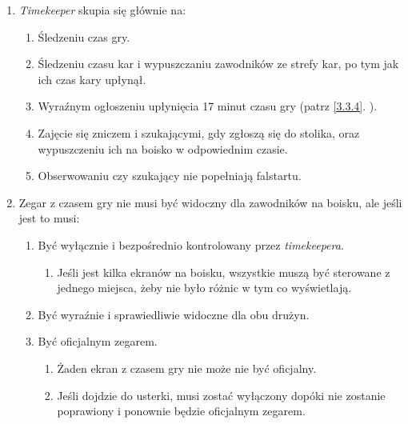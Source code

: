 \documentclass[11pt,a4paper]{article}
\newcommand{\myref}[1]{\ref{#1}. \nameref{#1}}
\begin{document}
\begin{enumerate}

\item
  \emph{Timekeeper} skupia się głównie na:

  \begin{enumerate}
  
  \item
    Śledzeniu czas gry.
  \item
    Śledzeniu czasu kar i wypuszczaniu zawodników ze strefy kar, po tym
    jak ich czas kary upłynął.
  \item
    Wyraźnym ogłoszeniu upłynięcia 17 minut czasu gry (patrz
    \myref{3.3.4}).
  \item
    Zajęcie się zniczem i szukającymi, gdy zgłoszą się do stolika, oraz
    wypuszczeniu ich na boisko w odpowiednim czasie.
  \item
    Obserwowaniu czy szukający nie popełniają falstartu.
  \end{enumerate}
\item
  Zegar z czasem gry nie musi być widoczny dla zawodników na boisku, ale
  jeśli jest to musi:

  \begin{enumerate}
  
  \item
    Być wyłącznie i bezpośrednio kontrolowany przez \emph{timekeepera}.

    \begin{enumerate}
    
    \item
      Jeśli jest kilka ekranów na boisku, wszystkie muszą być sterowane
      z jednego miejsca, żeby nie było różnic w tym co wyświetlają.
    \end{enumerate}
  \item
    Być wyraźnie i sprawiedliwie widoczne dla obu drużyn.
  \item
    Być oficjalnym zegarem.

    \begin{enumerate}
    
    \item
      Żaden ekran z czasem gry nie może nie być oficjalny.
    \item
      Jeśli dojdzie do usterki, musi zostać wyłączony dopóki nie
      zostanie poprawiony i ponownie będzie oficjalnym zegarem.
    \end{enumerate}
  \end{enumerate}
\end{enumerate}
\end{document}
